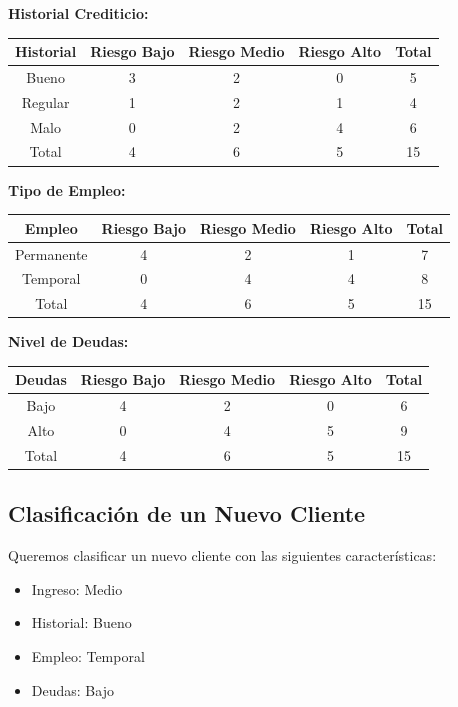 \documentclass[12pt]{article}
\begin{document}
\textbf{Historial Crediticio:}
\begin{table}[H]
    \centering
    \begin{tabular}{ccccc}
        \toprule
        Historial & Riesgo Bajo & Riesgo Medio & Riesgo Alto & Total \\
        \midrule
        Bueno & 3 & 2 & 0 & 5 \\
        Regular & 1 & 2 & 1 & 4 \\
        Malo & 0 & 2 & 4 & 6 \\
        \midrule
        Total & 4 & 6 & 5 & 15 \\
        \bottomrule
    \end{tabular}
\end{table}

\textbf{Tipo de Empleo:}
\begin{table}[H]
    \centering
    \begin{tabular}{ccccc}
        \toprule
        Empleo & Riesgo Bajo & Riesgo Medio & Riesgo Alto & Total \\
        \midrule
        Permanente & 4 & 2 & 1 & 7 \\
        Temporal & 0 & 4 & 4 & 8 \\
        \midrule
        Total & 4 & 6 & 5 & 15 \\
        \bottomrule
    \end{tabular}
\end{table}

\textbf{Nivel de Deudas:}
\begin{table}[H]
    \centering
    \begin{tabular}{ccccc}
        \toprule
        Deudas & Riesgo Bajo & Riesgo Medio & Riesgo Alto & Total \\
        \midrule
        Bajo & 4 & 2 & 0 & 6 \\
        Alto & 0 & 4 & 5 & 9 \\
        \midrule
        Total & 4 & 6 & 5 & 15 \\
        \bottomrule
    \end{tabular}
\end{table}

\subsection{Clasificación de un Nuevo Cliente}
Queremos clasificar un nuevo cliente con las siguientes características:
\begin{itemize}
    \item Ingreso: Medio
    \item Historial: Bueno
    \item Empleo: Temporal
    \item Deudas: Bajo
\end{itemize}
\end{document}

